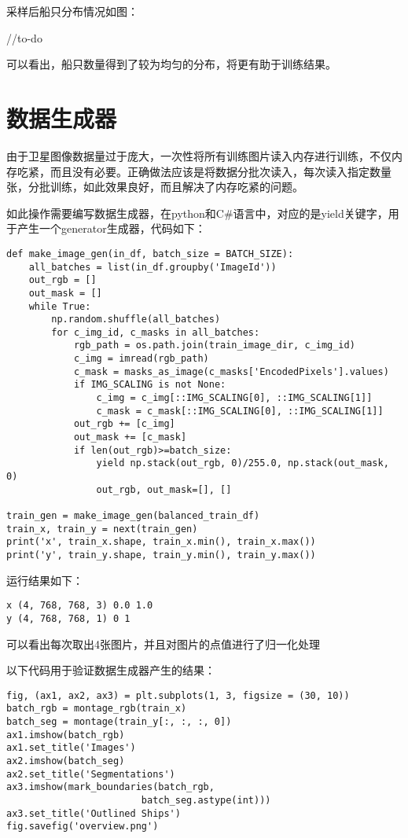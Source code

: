 采样后船只分布情况如图：

//to-do

可以看出，船只数量得到了较为均匀的分布，将更有助于训练结果。

\section{数据生成器}

由于卫星图像数据量过于庞大，一次性将所有训练图片读入内存进行训练，不仅内存吃紧，而且没有必要。正确做法应该是将数据分批次读入，每次读入指定数量张，分批训练，如此效果良好，而且解决了内存吃紧的问题。

如此操作需要编写数据生成器，在python和C\#语言中，对应的是yield关键字，用于产生一个generator生成器，代码如下：

\begin{verbatim}
def make_image_gen(in_df, batch_size = BATCH_SIZE):
    all_batches = list(in_df.groupby('ImageId'))
    out_rgb = []
    out_mask = []
    while True:
        np.random.shuffle(all_batches)
        for c_img_id, c_masks in all_batches:
            rgb_path = os.path.join(train_image_dir, c_img_id)
            c_img = imread(rgb_path)
            c_mask = masks_as_image(c_masks['EncodedPixels'].values)
            if IMG_SCALING is not None:
                c_img = c_img[::IMG_SCALING[0], ::IMG_SCALING[1]]
                c_mask = c_mask[::IMG_SCALING[0], ::IMG_SCALING[1]]
            out_rgb += [c_img]
            out_mask += [c_mask]
            if len(out_rgb)>=batch_size:
                yield np.stack(out_rgb, 0)/255.0, np.stack(out_mask, 0)
                out_rgb, out_mask=[], []

train_gen = make_image_gen(balanced_train_df)
train_x, train_y = next(train_gen)
print('x', train_x.shape, train_x.min(), train_x.max())
print('y', train_y.shape, train_y.min(), train_y.max())
\end{verbatim}

运行结果如下：

\begin{verbatim}
x (4, 768, 768, 3) 0.0 1.0
y (4, 768, 768, 1) 0 1
\end{verbatim}

可以看出每次取出4张图片，并且对图片的点值进行了归一化处理

以下代码用于验证数据生成器产生的结果：

\begin{verbatim}
fig, (ax1, ax2, ax3) = plt.subplots(1, 3, figsize = (30, 10))
batch_rgb = montage_rgb(train_x)
batch_seg = montage(train_y[:, :, :, 0])
ax1.imshow(batch_rgb)
ax1.set_title('Images')
ax2.imshow(batch_seg)
ax2.set_title('Segmentations')
ax3.imshow(mark_boundaries(batch_rgb, 
                        batch_seg.astype(int)))
ax3.set_title('Outlined Ships')
fig.savefig('overview.png')
\end{verbatim}

